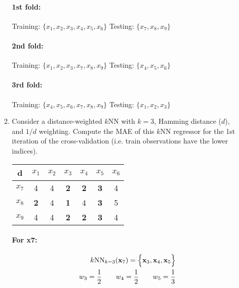 \documentclass[12pt]{article}
\begin{document}
\begin{enumerate}[leftmargin=\labelsep]
\begin{enumerate}
        \paragraph{1st fold:} Training: $\{x_1, x_2, x_3, x_4, x_5, x_6\}$ Testing: $\{x_7, x_8, x_9\}$
        \paragraph{2nd fold:} Training: $\{x_1, x_2, x_3, x_7, x_8, x_9\}$ Testing: $\{x_4, x_5, x_6\}$
        \paragraph{3rd fold:} Training: $\{x_4, x_5, x_6, x_7, x_8, x_9\}$ Testing: $\{x_1, x_2, x_3\}$
        \item  Consider a distance-weighted $k$NN with $k = 3$, Hamming distance ($d$), and $1/d$ weighting.
        Compute the MAE of this $k$NN regressor for the 1st iteration of the cross-validation (i.e. train
        observations have the lower indices).
        
        \begin{center}
            \begin{tabular}{|c|c|c|c|c|c|c|}
                \hline
                d & $x_1$ & $x_2$ & $x_3$ & $x_4$ & $x_5$ & $x_6$ \\
                \hline
                $x_7$ & 4 & 4 & \textbf{2} & \textbf{2} & \textbf{3} & 4 \\
                \hline
                $x_8$ & \textbf{2} & 4 & \textbf{1} & 4 & \textbf{3} & 5 \\
                \hline
                $x_9$ & 4 & 4 & \textbf{2} & \textbf{2} & \textbf{3} & 4 \\
                \hline
            \end{tabular}
        \end{center}

        \paragraph{For x7:}

        \begin{equation}
        \begin{split}
            k\textrm{NN}_{k = 3}(\mathbf{x}_7) = \Bigl\{ \mathbf{x}_3, \mathbf{x}_4, \mathbf{x}_5\Bigr\} \\
            w_3 = \frac{1}{2} \qquad w_4 = \frac{1}{2} \qquad w_5 = \frac{1}{3}
        \end{split}
        \end{equation}


\end{enumerate}
\end{enumerate}
\end{document}

